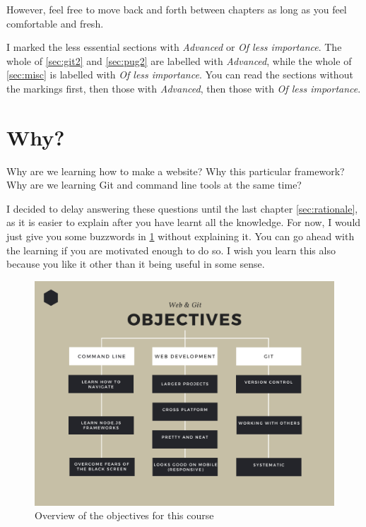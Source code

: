 However, feel free to move back and forth between chapters as long as you feel comfortable and fresh. 
\vspace{6mm}

I marked the less essential sections with \textit{Advanced} or \textit{Of less importance}. The whole of \cref{sec:git2} and \cref{sec:pug2} are labelled with \textit{Advanced}, while the whole of \cref{sec:misc} is labelled with \textit{Of less importance}. You can read the sections without the markings first, then those with \textit{Advanced}, then those with \textit{Of less importance}.

\section{Why?}

Why are we learning how to make a website? Why this particular framework? Why are we learning Git and command line tools at the same time?

I decided to delay answering these questions until the last chapter \cref{sec:rationale}, as it is easier to explain after you have learnt all the knowledge. For now, I would just give you some buzzwords in \cref{fig:objective} without explaining it. You can go ahead with the learning if you are motivated enough to do so. I wish you learn this also because you like it other than it being useful in some sense.
 
\begin{figure}[h]
\centering
\includegraphics[width=15cm]{images/chn0-objectives.png}
\caption{Overview of the objectives for this course}
\label{fig:objective}
\end{figure}

